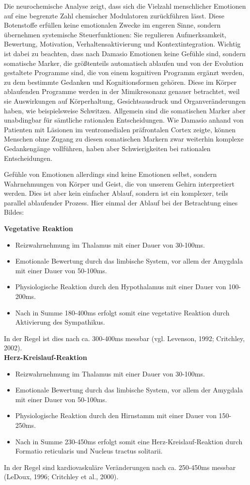 Die neurochemische Analyse zeigt, dass sich die Vielzahl menschlicher Emotionen auf eine begrenzte Zahl chemischer Modulatoren zurückführen lässt. Diese Botenstoffe erfüllen keine emotionalen Zwecke im engeren Sinne, sondern übernehmen systemische Steuerfunktionen: Sie regulieren Aufmerksamkeit, Bewertung, Motivation, Verhaltensaktivierung und Kontextintegration. Wichtig ist dabei zu beachten, dass nach Damasio Emotionen keine Gefühle sind, sondern somatische Marker, die größtenteils automatisch ablaufen und von der Evolution gestaltete Programme sind, die von einem kognitiven Programm ergänzt werden, zu dem bestimmte Gedanken und Kognitionsformen gehören. Diese im Körper ablaufenden Programme werden in der Mimikresonanz genauer betrachtet, weil sie Auswirkungen auf Körperhaltung, Gesichtsausdruck und Organveränderungen haben, wie beispielsweise Schwitzen. Allgemein sind die somatischen Marker aber unabdingbar für sämtliche rationalen Entscheidungen. Wie Damasio anhand von Patienten mit Läsionen im ventromedialen präfrontalen Cortex zeigte, können Menschen ohne Zugang zu diesen somatischen Markern zwar weiterhin komplexe Gedankengänge vollführen, haben aber Schwierigkeiten bei rationalen Entscheidungen.

Gefühle von Emotionen allerdings sind keine Emotionen selbst, sondern Wahrnehmungen von Körper und Geist, die von unserem Gehirn interpretiert werden. Dies ist aber kein einfacher Ablauf, sondern ist ein komplexer, teils parallel ablaufender Prozess. Hier einmal der Ablauf bei der Betrachtung eines Bildes:

\textbf{Vegetative Reaktion}

\begin{itemize}
  \item Reizwahrnehmung im Thalamus mit einer Dauer von 30-100ms.
  \item Emotionale Bewertung durch das limbische System, vor allem der Amygdala mit einer Dauer von 50-100ms.
  \item Physiologische Reaktion durch den Hypothalamus mit einer Dauer von 100-200ms.
  \item Nach in Summe 180-400ms erfolgt somit eine vegetative Reaktion durch Aktivierung des Sympathikus.
\end{itemize}
In der Regel ist dies nach ca. 300-400ms messbar (vgl. Levenson, 1992; Critchley, 2002).\\

\textbf{Herz-Kreislauf-Reaktion}

\begin{itemize}
  \item Reizwahrnehmung im Thalamus mit einer Dauer von 30-100ms.
  \item Emotionale Bewertung durch das limbische System, vor allem der Amygdala mit einer Dauer von 50-100ms.
  \item Physiologische Reaktion durch den Hirnstamm mit einer Dauer von 150-250ms.
  \item Nach in Summe 230-450ms erfolgt somit eine Herz-Kreislauf-Reaktion durch Formatio reticularis und Nucleus tractus solitarii.
\end{itemize}
In der Regel sind kardiovaskuläre Veränderungen nach ca. 250-450ms messbar (LeDoux, 1996; Critchley et al., 2000).

